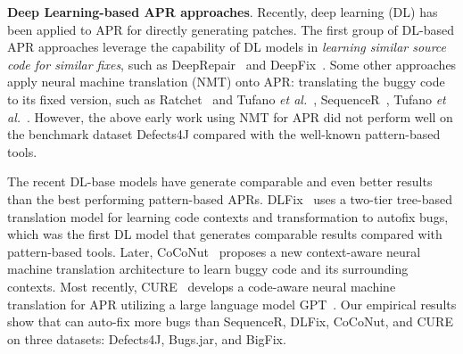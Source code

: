 {\bf Deep Learning-based APR approaches}. Recently, deep learning (DL)
has been applied to APR for directly generating patches. 
 The first group of DL-based APR approaches leverage the capability of DL models
in {\em learning similar source code for similar fixes}, such as DeepRepair~\cite{white2016deep} and DeepFix~\cite{gupta2017deepfix}. 
Some other approaches apply neural machine translation (NMT) onto APR: translating the buggy code to its fixed version, such as Ratchet~\cite{hata2018learning} and Tufano {\em et al.}~\cite{tufano2018empirical}, SequenceR~\cite{chen2018sequencer}, Tufano {\em et al.}~\cite{tufano2019learning}. However, the above early work using NMT for APR did not perform well on the benchmark dataset Defects4J compared with the well-known pattern-based tools. 

The recent DL-base models have generate comparable and even better results than the best performing pattern-based APRs. DLFix~\cite{li2020dlfix} uses a two-tier tree-based translation model for learning code contexts and transformation to autofix bugs, which was the first DL model that generates comparable results compared with pattern-based tools. Later, CoCoNut~\cite{lutellier2020coconut} proposes a new context-aware neural machine translation architecture to learn buggy code and its surrounding contexts. 
Most recently, CURE~\cite{cure-icse21} develops a code-aware neural machine translation for APR utilizing a large language model GPT~\cite{radford2018improving}. Our empirical results show that {\tool} can auto-fix more bugs than SequenceR, DLFix, CoCoNut, and CURE on three datasets: Defects4J, Bugs.jar, and BigFix. 



